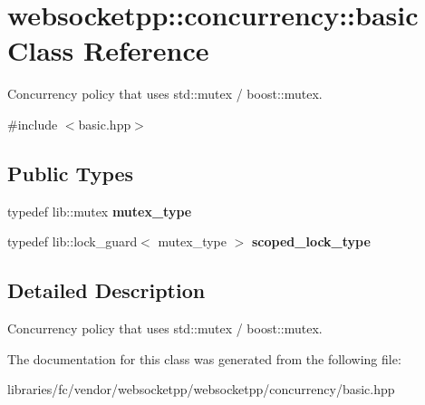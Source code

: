 \hypertarget{classwebsocketpp_1_1concurrency_1_1basic}{}\section{websocketpp\+:\+:concurrency\+:\+:basic Class Reference}
\label{classwebsocketpp_1_1concurrency_1_1basic}


Concurrency policy that uses std\+::mutex / boost\+::mutex.  




{\ttfamily \#include $<$basic.\+hpp$>$}

\subsection*{Public Types}
\begin{DoxyCompactItemize}
\item 
\mbox{\label{classwebsocketpp_1_1concurrency_1_1basic_aa017bc1a233b748f5e0e56b5e8a8c0bc}} 
typedef lib\+::mutex {\bfseries mutex\+\_\+type}
\item 
\mbox{\label{classwebsocketpp_1_1concurrency_1_1basic_ac5f4f16695c8c578face2e4dac291b93}} 
typedef lib\+::lock\+\_\+guard$<$ mutex\+\_\+type $>$ {\bfseries scoped\+\_\+lock\+\_\+type}
\end{DoxyCompactItemize}


\subsection{Detailed Description}
Concurrency policy that uses std\+::mutex / boost\+::mutex. 

The documentation for this class was generated from the following file\+:\begin{DoxyCompactItemize}
\item 
libraries/fc/vendor/websocketpp/websocketpp/concurrency/basic.\+hpp\end{DoxyCompactItemize}
